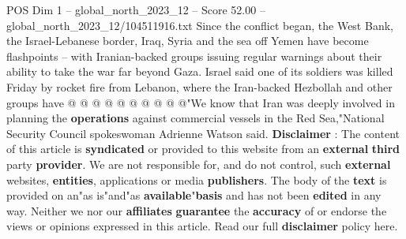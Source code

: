 \begin{textsample}{POS Dim 1 – global\_north\_2023\_12 – Score 52.00 – global\_north\_2023\_12/104511916.txt}
Since the conflict began, the West Bank, the Israel-Lebanese border, Iraq, Syria and the sea off Yemen have become flashpoints -- with Iranian-backed groups issuing regular warnings about their ability to take the war far beyond Gaza.
Israel said one of its soldiers was killed Friday by rocket fire from Lebanon, where the Iran-backed Hezbollah and other groups have @ @ @ @ @ @ @ @ @ @"We know that Iran was deeply involved in planning the \textbf{operations} against commercial vessels in the Red Sea,"National Security Council spokeswoman Adrienne Watson said. \textbf{Disclaimer} : The content of this article is \textbf{syndicated} or provided to this website from an \textbf{external} \textbf{third} party \textbf{provider}.
We are not responsible for, and do not control, such \textbf{external} websites, \textbf{entities}, applications or media \textbf{publishers}.
The body of the \textbf{text} is provided on an"as is"and"as \textbf{available}"\textbf{basis} and has not been \textbf{edited} in any way.
Neither we nor our \textbf{affiliates} \textbf{guarantee} the \textbf{accuracy} of or endorse the views or opinions expressed in this article.
Read our full \textbf{disclaimer} policy here.

\end{textsample}
